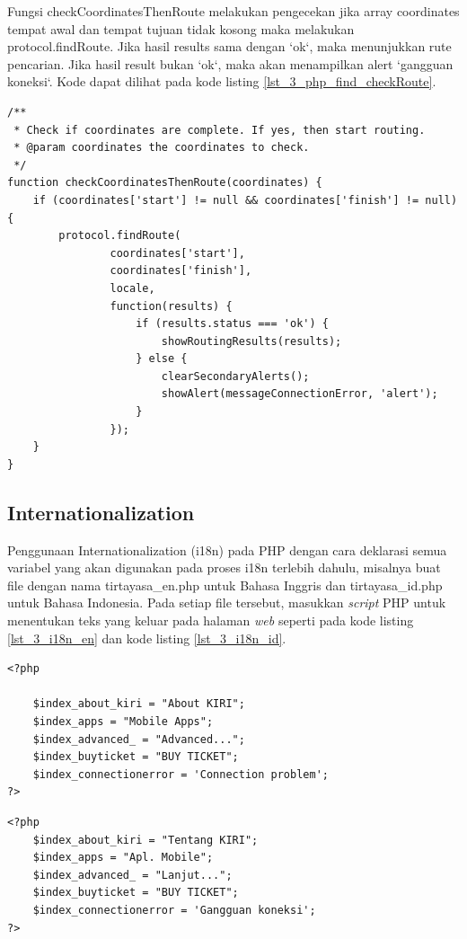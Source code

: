 Fungsi checkCoordinatesThenRoute melakukan pengecekan jika array coordinates tempat awal dan tempat tujuan tidak kosong maka melakukan protocol.findRoute. Jika hasil results sama dengan `ok`, maka menunjukkan rute pencarian. Jika hasil result bukan `ok`, maka akan menampilkan alert `gangguan koneksi`. Kode dapat dilihat pada kode listing \ref{lst_3_php_find_checkRoute}.
\begin{lstlisting}[caption=Fungsi JavaScript checkCoordinatesThenRoute,label = {lst_3_php_find_checkRoute}]
/**
 * Check if coordinates are complete. If yes, then start routing.
 * @param coordinates the coordinates to check.
 */
function checkCoordinatesThenRoute(coordinates) {
	if (coordinates['start'] != null && coordinates['finish'] != null) {
		protocol.findRoute(
				coordinates['start'],
				coordinates['finish'],
				locale,
				function(results) {
					if (results.status === 'ok') {
						showRoutingResults(results);
					} else {
						clearSecondaryAlerts();
						showAlert(messageConnectionError, 'alert');
					}
				});
	}
}
\end{lstlisting}

\subsection{Internationalization}
Penggunaan Internationalization (i18n) pada PHP dengan cara deklarasi semua variabel yang akan digunakan pada proses i18n terlebih dahulu, misalnya buat file dengan nama tirtayasa\_en.php untuk Bahasa Inggris dan tirtayasa\_id.php untuk Bahasa Indonesia. Pada setiap file tersebut, masukkan \textit{script} PHP untuk menentukan teks yang keluar pada halaman \textit{web} seperti pada kode listing \ref{lst_3_i18n_en} dan kode listing \ref{lst_3_i18n_id}. 

\begin{lstlisting}[caption=Script PHP untuk Bahasa Inggris,label = {lst_3_i18n_en}]
<?php

	$index_about_kiri = "About KIRI";
	$index_apps = "Mobile Apps";
	$index_advanced_ = "Advanced...";
	$index_buyticket = "BUY TICKET";
	$index_connectionerror = 'Connection problem';
?>
\end{lstlisting}


\begin{lstlisting}[caption=Script PHP untuk Bahasa Indonesia,label = {lst_3_i18n_id}]
<?php
	$index_about_kiri = "Tentang KIRI";
	$index_apps = "Apl. Mobile";
	$index_advanced_ = "Lanjut...";
	$index_buyticket = "BUY TICKET";
	$index_connectionerror = 'Gangguan koneksi';
?>
\end{lstlisting}

